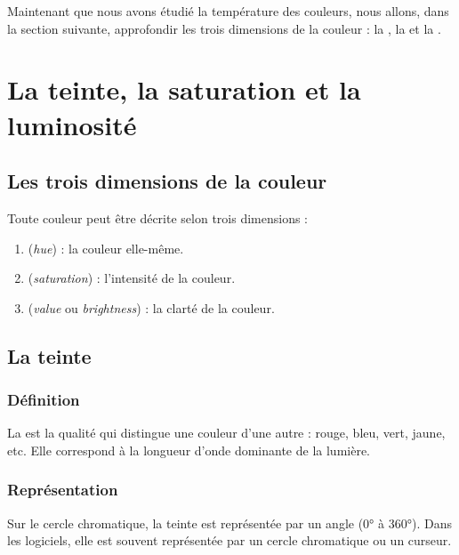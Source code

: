 Maintenant que nous avons étudié la température des couleurs, nous allons, dans la section suivante, approfondir les trois dimensions de la couleur : la , la  et la .

\section{La teinte, la saturation et la luminosité}

\subsection{Les trois dimensions de la couleur}

Toute couleur peut être décrite selon trois dimensions :

\begin{enumerate}[label=\textbf{\arabic*.}]
    \item {} (\emph{hue}) : la couleur elle-même.
    \item {} (\emph{saturation}) : l'intensité de la couleur.
    \item {} (\emph{value} ou \emph{brightness}) : la clarté de la couleur.
\end{enumerate}

\subsection{La teinte}

\subsubsection{Définition}

La  est la qualité qui distingue une couleur d'une autre : rouge, bleu, vert, jaune, etc. Elle correspond à la longueur d'onde dominante de la lumière.

\subsubsection{Représentation}

Sur le cercle chromatique, la teinte est représentée par un angle (0° à 360°). Dans les logiciels, elle est souvent représentée par un cercle chromatique ou un curseur.

